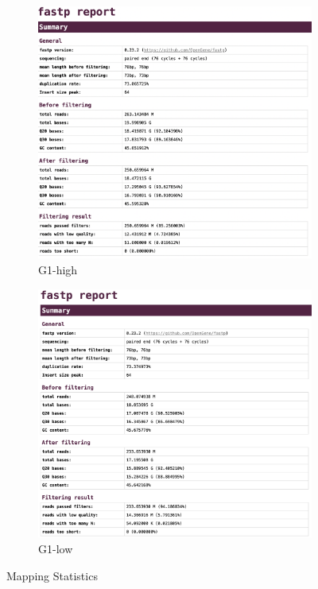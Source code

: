 \documentclass{article}
\begin{document}
\begin{figure}[h]

	\begin{subfigure}
		{0.5\textwidth}
		\includegraphics[width = 1.5\linewidth ]{high-qc.png}
		\caption{G1-high}
		\label{fig:g1-high-qc}


	\end{subfigure}



	\begin{subfigure}
		{0.5\textwidth}
		\includegraphics[width = 1.5\linewidth ]{low-qc.png}
		\caption{G1-low}
		\label{fig:g1-low-qc}


	\end{subfigure}

	\caption{Mapping Statistics}
	\label{fig:ms}
\end{figure}
\end{document}
